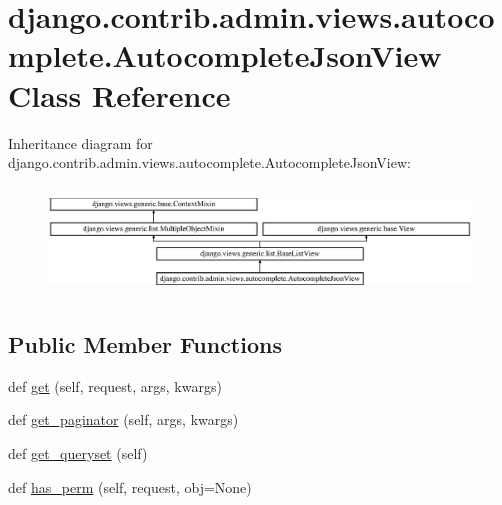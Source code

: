 \hypertarget{classdjango_1_1contrib_1_1admin_1_1views_1_1autocomplete_1_1_autocomplete_json_view}{}\section{django.\+contrib.\+admin.\+views.\+autocomplete.\+Autocomplete\+Json\+View Class Reference}
\label{classdjango_1_1contrib_1_1admin_1_1views_1_1autocomplete_1_1_autocomplete_json_view}
Inheritance diagram for django.\+contrib.\+admin.\+views.\+autocomplete.\+Autocomplete\+Json\+View\+:\begin{figure}[H]
\begin{center}
\leavevmode
\includegraphics[height=2.894057cm]{classdjango_1_1contrib_1_1admin_1_1views_1_1autocomplete_1_1_autocomplete_json_view}
\end{center}
\end{figure}
\subsection*{Public Member Functions}
\begin{DoxyCompactItemize}
\item 
def \mbox{\hyperlink{classdjango_1_1contrib_1_1admin_1_1views_1_1autocomplete_1_1_autocomplete_json_view_add1caed14ddbbf5ca1007bd9c2ee068e}{get}} (self, request, args, kwargs)
\item 
def \mbox{\hyperlink{classdjango_1_1contrib_1_1admin_1_1views_1_1autocomplete_1_1_autocomplete_json_view_ad4ce0b5f9f01c7f800040da0552a8855}{get\+\_\+paginator}} (self, args, kwargs)
\item 
def \mbox{\hyperlink{classdjango_1_1contrib_1_1admin_1_1views_1_1autocomplete_1_1_autocomplete_json_view_aeba422d947101bce361f0fd32ff7d4d4}{get\+\_\+queryset}} (self)
\item 
def \mbox{\hyperlink{classdjango_1_1contrib_1_1admin_1_1views_1_1autocomplete_1_1_autocomplete_json_view_af3b9e33b553e810eed5586513ceb5568}{has\+\_\+perm}} (self, request, obj=None)
\end{DoxyCompactItemize}
